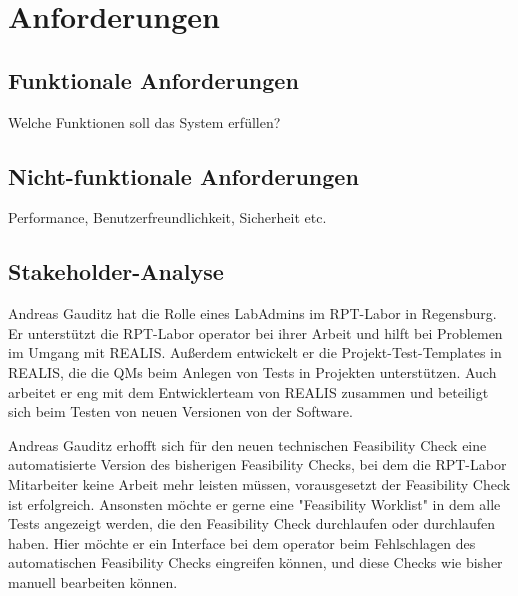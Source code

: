 \chapter{Anforderungen}\label{Chap:Anforderungen}

\section{Funktionale Anforderungen}
Welche Funktionen soll das System erfüllen?
\section{Nicht-funktionale Anforderungen}
Performance, Benutzerfreundlichkeit, Sicherheit etc.

\section{Stakeholder-Analyse}
Andreas Gauditz hat die Rolle eines LabAdmins im \ac{RPT}-Labor in Regensburg. Er unterstützt die \ac{RPT}-Labor \gls{operator} bei ihrer Arbeit und hilft bei Problemen im Umgang mit \ac{REALIS}. Außerdem entwickelt er die Projekt-Test-Templates in \ac{REALIS}, die die \acp{QM} beim Anlegen von Tests in Projekten unterstützen.
Auch arbeitet er eng mit dem Entwicklerteam von \ac{REALIS} zusammen und beteiligt sich beim Testen von neuen Versionen von der Software.

Andreas Gauditz erhofft sich für den neuen technischen Feasibility Check eine automatisierte Version des bisherigen Feasibility Checks, bei dem die \ac{RPT}-Labor Mitarbeiter keine Arbeit mehr leisten müssen, vorausgesetzt der Feasibility Check ist erfolgreich. Ansonsten möchte er gerne eine "Feasibility Worklist" in dem alle Tests angezeigt werden, die den Feasibility Check durchlaufen oder durchlaufen haben. Hier möchte er ein Interface bei dem \gls{operator} beim Fehlschlagen des automatischen Feasibility Checks eingreifen können, und diese Checks wie bisher manuell bearbeiten können.
